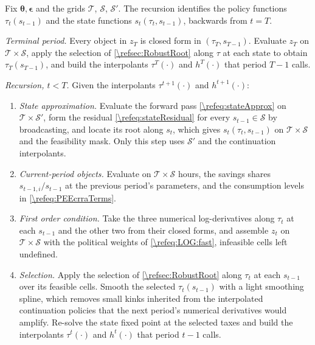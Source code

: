 \begin{alg}
\label{\refalg:CRRA:grid}
Fix $\bm{\theta},\bm{\epsilon}$ and the grids $\mathcal{T}$, $\mathcal{S}$, $\mathcal{S}'$. The recursion identifies the policy functions $\tau_t(s_{t-1})$ and the state functions $s_t(\tau_t, s_{t-1})$, backwards from $t=T$.

\smallskip\noindent\emph{Terminal period.} Every object in $z_T$ is closed form in $(\tau_T, s_{T-1})$. Evaluate $z_T$ on $\mathcal{T}\times\mathcal{S}$, apply the selection of \cref{\refsec:RobustRoot} along $\tau$ at each state to obtain $\tau_T(s_{T-1})$, and build the interpolants $\tau^T(\cdot)$ and $h^T(\cdot)$ that period $T-1$ calls.

\smallskip\noindent\emph{Recursion, $t<T$.} Given the interpolants $\tau^{t+1}(\cdot)$ and $h^{t+1}(\cdot)$:
\begin{enumerate}
    \item \emph{State approximation.} Evaluate the forward pass \eqref{\refeq:stateApprox} on $\mathcal{T}\times\mathcal{S}'$, form the residual \eqref{\refeq:stateResidual} for every $s_{t-1}\in\mathcal{S}$ by broadcasting, and locate its root along $s_t$, which gives $s_t(\tau_t, s_{t-1})$ on $\mathcal{T}\times\mathcal{S}$ and the feasibility mask. Only this step uses $\mathcal{S}'$ and the continuation interpolants.
    \item \emph{Current-period objects.} Evaluate on $\mathcal{T}\times\mathcal{S}$ hours, the savings shares $s_{t-1,i}/s_{t-1}$ at the previous period's parameters, and the consumption levels in \eqref{\refeq:PEEcrraTerms}.
    \item \emph{First order condition.} Take the three numerical log-derivatives along $\tau_t$ at each $s_{t-1}$ and the other two from their closed forms, and assemble $z_t$ on $\mathcal{T}\times\mathcal{S}$ with the political weights of \eqref{\refeq:LOG:fast}, infeasible cells left undefined.
    \item \emph{Selection.} Apply the selection of \cref{\refsec:RobustRoot} along $\tau_t$ at each $s_{t-1}$ over its feasible cells. Smooth the selected $\tau_t(s_{t-1})$ with a light smoothing spline, which removes small kinks inherited from the interpolated continuation policies that the next period's numerical derivatives would amplify. Re-solve the state fixed point at the selected taxes and build the interpolants $\tau^t(\cdot)$ and $h^t(\cdot)$ that period $t-1$ calls.
\end{enumerate}
\end{alg}
